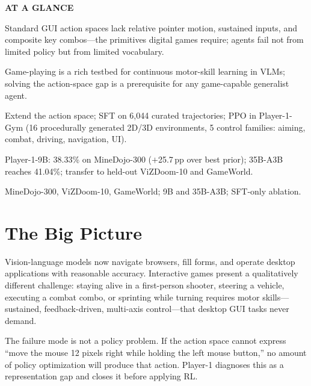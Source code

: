 \documentclass[10pt,twocolumn]{article}
\begin{document}
\begin{mdframed}[backgroundcolor=boxgray,linecolor=rulered,linewidth=1pt,
    innerleftmargin=6pt,innerrightmargin=6pt,
    innertopmargin=6pt,innerbottommargin=6pt]
\textbf{\small AT A GLANCE}\par\vspace{4pt}
\begin{description}[leftmargin=0pt,labelsep=4pt,itemsep=2pt,parsep=0pt,
    font=\small\bfseries]
  \item[Problem:] Standard GUI action spaces lack relative pointer motion,
    sustained inputs, and composite key combos---the primitives digital games
    require; agents fail not from limited policy but from limited vocabulary.
  \item[Why it matters:] Game-playing is a rich testbed for continuous motor-skill
    learning in VLMs; solving the action-space gap is a prerequisite for any
    game-capable generalist agent.
  \item[Method:] Extend the action space; SFT on 6,044 curated trajectories;
    PPO in Player-1-Gym (16 procedurally generated 2D/3D environments,
    5 control families: aiming, combat, driving, navigation, UI).
  \item[Result:] Player-1-9B: 38.33\% on MineDojo-300
    ($+$25.7\,pp over best prior); 35B-A3B reaches 41.04\%;
    transfer to held-out ViZDoom-10 and GameWorld.
  \item[Evidence:] MineDojo-300, ViZDoom-10, GameWorld; 9B and 35B-A3B;
    SFT-only ablation.
\end{description}
\end{mdframed}

\section{The Big Picture}

Vision-language models now navigate browsers, fill forms, and operate desktop
applications with reasonable accuracy. Interactive games present a qualitatively
different challenge: staying alive in a first-person shooter, steering a vehicle,
executing a combat combo, or sprinting while turning requires motor skills---
sustained, feedback-driven, multi-axis control---that desktop GUI tasks never
demand.

The failure mode is not a policy problem. If the action space cannot express
``move the mouse 12 pixels right while holding the left mouse button,'' no amount
of policy optimization will produce that action. Player-1 diagnoses this as a
representation gap and closes it before applying RL.
\end{document}
